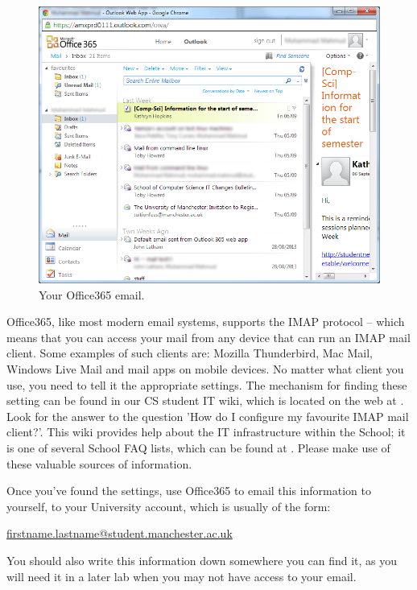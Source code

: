 \begin{figure}
\centerline{\includegraphics[width=15cm]{images/hamza-365-mail.png}}
\caption{Your Office365 email.}
\label{figure:welc-mail365}
\end{figure}

\label{sec:reading-your-mail}

Office365, like most modern email systems, supports the IMAP
protocol -- which means that you can access your mail from any device
that can run an IMAP mail client. Some examples of such clients are:
Mozilla Thunderbird, Mac Mail, Windows Live Mail and mail apps on mobile devices. No matter what
client you use, you need to tell it the appropriate settings. The mechanism for finding these setting can be found in our CS student IT wiki, which is located on the web at . Look for the answer to the question 'How do I configure my favourite IMAP mail client?'. This wiki provides help about the IT infrastructure within the School; it is one of several School FAQ lists, which can be found at . Please make use of these valuable sources of information.

Once you've found the settings, use Office365 to email this information to yourself, to your
University account, which is usually of the form:

\url{firstname.lastname@student.manchester.ac.uk}

You should also write this information down somewhere you can find it, as you will need it in a later lab when you may not have access to your email.

